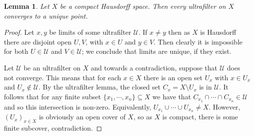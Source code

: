 \documentclass[a4paper,12pt]{article}
\theoremstyle{plain}
\newtheorem{lemma}[proposition]{Lemma}
\theoremstyle{definition}
\newcommand{\mc}[1]{\mathcal{#1}}
\begin{document}
\begin{lemma}
Let $X$ be a compact Hausdorff space.  Then every ultrafilter on $X$ converges to a unique point.
\end{lemma}
\begin{proof}
Let $x,y$ be limits of some ultrafilter $\mc U$.  If $x\not=y$ then as $X$ is Hausdorff there are
disjoint open $U,V$, with $x\in U$ and $y\in V$.  Then clearly it is impossible for both $U\in\mc U$
and $V\in\mc U$; we conclude that limits are unique, if they exist.

Let $\mc U$ be an ultrafilter on $X$ and towards a contradiction, suppose that $\mc U$ does not converge.
This means that for each $x\in X$ there is an open set $U_x$ with $x\in U_x$ and $U_x\not\in \mc U$.
By the ultrafilter lemma, the closed set $C_x = X\setminus U_x$ is in $\mc U$.  It follows that for any
finite subset $\{x_1,\cdots,x_n\}\subseteq X$ we have that $C_{x_1} \cap\cdots\cap C_{x_n} \in\mc U$
and so this intersection is non-zero.  Equivalently, $U_{x_1} \cup\cdots\cup U_{x_n} \not= X$.
However, $(U_x)_{x\in X}$ is obviously an open cover of $X$, so as $X$ is compact, there is some
finite subcover, contradiction.
\end{proof}
\end{document}
